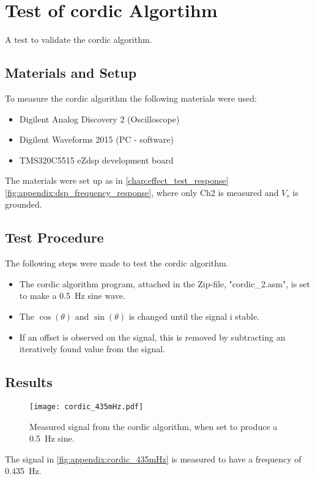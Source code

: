 \chapter{Test of \gls{cordic} Algortihm}\label{app:cordic_shape}
A test to validate the \gls{cordic} algorithm.

\section*{Materials and Setup}
To measure the \gls{cordic} algorithm the following materials were used:
\begin{itemize}
\item Digilent Analog Discovery 2 (Oscilloscope)
\item Digilent Waveforms 2015 (PC - software)
\item TMS320C5515 eZdsp development board
\end{itemize}

The materials were set up as in \autoref{chap:effect_test_response} \autoref{fig:appendix:dsp_frequency_response}, where only Ch2 is measured and $V_s$ is grounded.

\section*{Test Procedure}
The following steps were made to test the \gls{cordic} algorithm.
\begin{itemize}
\item The \gls{cordic} algorithm program, attached in the Zip-file, "cordic_2.asm", is set to make a \SI{0.5}{\hertz} sine wave.
\item The $\cos(\theta)$ and $\sin(\theta)$ is changed until the signal i stable.
\item If an offset is observed on the signal, this is removed by subtracting an iteratively found value from the signal.
\end{itemize} 

\section*{Results} 

\begin{figure}[htbp!]
	\centering
		\texttt{[image: cordic\_435mHz.pdf]}
		\caption{Measured signal from the \gls{cordic} algorithm, when set to produce a \SI{0.5}{\hertz} sine.}
		\label{fig:appendix:cordic_435mHz}
\end{figure}

The signal in \autoref{fig:appendix:cordic_435mHz} is measured to have a frequency of \SI{0.435}{\hertz}.